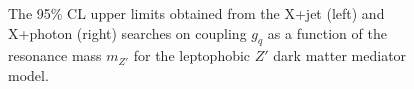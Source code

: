 \begin{figure}[ht!]
	\centering
	\hspace{0.1\textwidth}%
	\caption{The 95\% CL upper limits obtained from the X+jet (left) and X+photon (right) searches on coupling $g_q$ as a function of the resonance mass $m_{Z'}$ for the leptophobic $Z'$ dark matter mediator model.}
	\label{fig:ISR_Resolved_Limits}
\end{figure}

